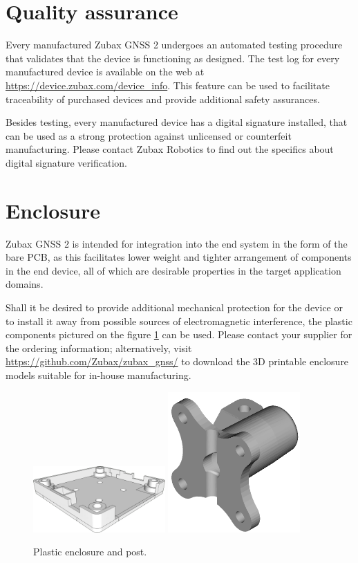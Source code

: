 \documentclass{zubaxdoc}
\begin{document}
\section{Quality assurance}

Every manufactured Zubax GNSS 2 undergoes an automated testing procedure that validates that
the device is functioning as designed.
The test log for every manufactured device is available on the web at
\url{https://device.zubax.com/device_info}.
This feature can be used to facilitate traceability of purchased devices and
provide additional safety assurances.

Besides testing, every manufactured device has a digital signature installed,
that can be used as a strong protection against unlicensed or counterfeit manufacturing.
Please contact Zubax Robotics
to find out the specifics about digital signature verification.

\section{Enclosure}\label{sec:enclosure}

Zubax GNSS 2 is intended for integration into the end system in the form of the bare PCB,
as this facilitates lower weight and tighter arrangement of components
in the end device, all of which are desirable properties in the target application domains.

Shall it be desired to provide additional mechanical protection for the device or to install it away from possible sources of electromagnetic interference, the plastic components pictured on the figure \ref{enclosure} can be used.
Please contact your supplier for the ordering information;
alternatively, visit \url{https://github.com/Zubax/zubax_gnss/} to download
the 3D printable enclosure models suitable for in-house manufacturing.

\begin{figure}[hb]
	\centering
	\includegraphics[width=0.45\textwidth]{housing}
	\includegraphics[width=0.45\textwidth]{post}
	\caption{Plastic enclosure and post.\label{enclosure}}
\end{figure}
\end{document}
